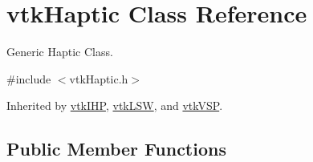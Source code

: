 \hypertarget{classvtkHaptic}{
\section{vtkHaptic Class Reference}
\label{classvtkHaptic}
}


Generic Haptic Class.  




{\ttfamily \#include $<$vtkHaptic.h$>$}



Inherited by \hyperlink{classvtkIHP}{vtkIHP}, \hyperlink{classvtkLSW}{vtkLSW}, and \hyperlink{classvtkVSP}{vtkVSP}.

\subsection*{Public Member Functions}
